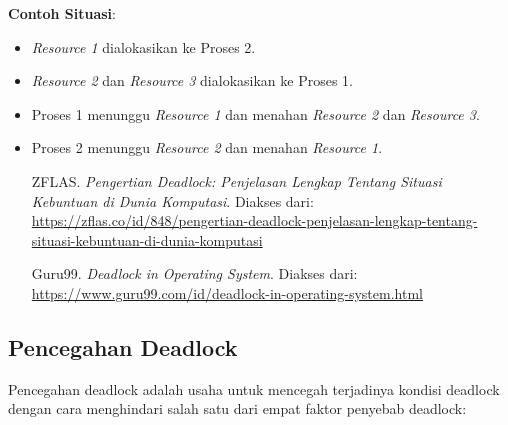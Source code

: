 \documentclass[12pt]{article}
\begin{document}
\textbf{Contoh Situasi}:
\begin{itemize}
    \item \textit{Resource 1} dialokasikan ke Proses 2.
    \item \textit{Resource 2} dan \textit{Resource 3} dialokasikan ke Proses 1.
    \item Proses 1 menunggu \textit{Resource 1} dan menahan \textit{Resource 2} dan \textit{Resource 3}.
    \item Proses 2 menunggu \textit{Resource 2} dan menahan \textit{Resource 1}.

    \begin{thebibliography}{9}

ZFLAS. 
\textit{Pengertian Deadlock: Penjelasan Lengkap Tentang Situasi Kebuntuan di Dunia Komputasi}. 
Diakses dari: \url{https://zflas.co/id/848/pengertian-deadlock-penjelasan-lengkap-tentang-situasi-kebuntuan-di-dunia-komputasi}

Guru99. 
\textit{Deadlock in Operating System}. 
Diakses dari: \url{https://www.guru99.com/id/deadlock-in-operating-system.html}

\end{thebibliography}


\end{itemize}
    \subsection{Pencegahan Deadlock}
    Pencegahan deadlock adalah usaha untuk mencegah terjadinya kondisi deadlock dengan cara menghindari salah satu dari empat faktor penyebab deadlock:
    
\end{document}
